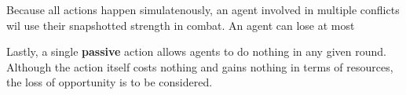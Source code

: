 Because all actions happen simulatenously, an agent involved in multiple conflicts wil use their snapshotted strength in combat. An agent can lose at most 




Lastly, a single \textbf{passive} action allows agents to do nothing in any given round. Although the action itself costs nothing and gains nothing in terms of resources, the loss of opportunity is to be considered.



